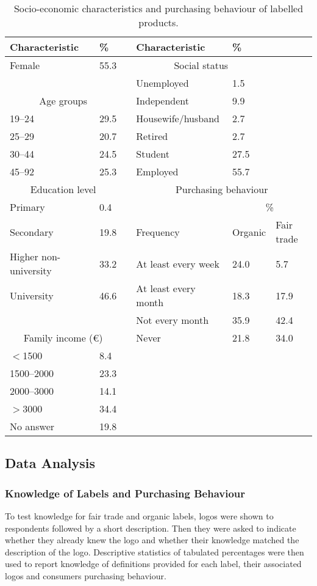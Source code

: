 \documentclass[sustainability,article,accept,moreauthors,pdftex,10pt,a4paper]{Definitions/mdpi}
\theoremstyle{mdpi}
\newcounter{ex}
\newcounter{re}
\theoremstyle{mdpidefinition}
\begin{document}
{\begin{table}[H]
\centering
\caption{Socio-economic characteristics and purchasing behaviour of labelled products.}
\vspace{-6pt}
\label{socioeconomiceda}
\begin{tabular}{p{3.9cm} p{0.9cm}p{0.9cm}p{3.75cm} p{1.8cm}p{1.8cm}}\\ \toprule
\textbf{Characteristic} & \textbf{\%} & & \textbf{Characteristic} & \textbf{\%} & \\ \midrule
Female & 55.3 &  & \multicolumn{2}{c}{Social status}  &\\
& &              & Unemployed & 1.5 \\ \midrule
\multicolumn{2}{c}{Age groups}   &  & Independent & 9.9\\
19--24 & 29.5 &  & Housewife/husband & 2.7 \\
25--29 & 20.7 &  & Retired & 2.7 \\
30--44 & 24.5 &  & Student & 27.5 \\
45--92 & 25.3 & &   Employed & 55.7 \\ \midrule
\multicolumn{2}{c}{Education level}   &&  \multicolumn{3}{c}{Purchasing behaviour} \\
Primary & 0.4         &            & &    \multicolumn{2}{c}{\%} \\
Secondary & 19.8     & & Frequency & Organic & Fair trade  \\
Higher non-university & 33.2   &  &At least every week & 24.0 & 5.7 \\
University & 46.6  &    &At least every month & 18.3 & 17.9 \\
& &&  Not every month & 35.9 & 42.4 \\\midrule
\multicolumn{2}{c}{Family income (\euro)}                  &  &  Never & 21.8 & 34.0 \\
$<$1500 & 8.4                    \\
1500--2000 & 23.3      \\
2000--3000 & 14.1 \\
$>$3000 & 34.4 \\
No answer & 19.8 \\ \bottomrule
\end{tabular}
\end{table}

\subsection{Data Analysis}
\unskip
\subsubsection{Knowledge of Labels and Purchasing Behaviour}
\par{To test knowledge for fair trade and organic labels, logos were shown to respondents followed by a short description. Then they were asked to indicate whether they already knew the logo and whether their knowledge matched the description of the logo. Descriptive statistics of tabulated percentages were then used to report knowledge of definitions provided for each label, their associated logos and consumers purchasing behaviour.}

}
\end{document}
